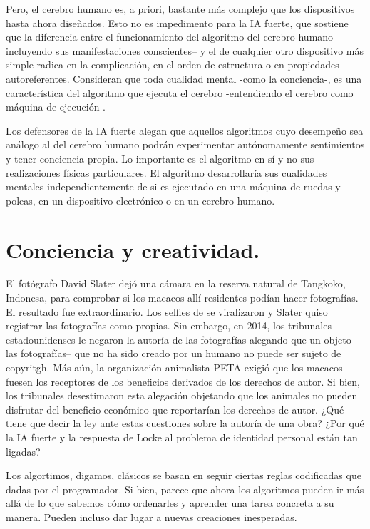\documentclass[main.tex]{subfiles}
\begin{document}
Pero, el cerebro humano es, a priori, bastante más complejo que los dispositivos hasta ahora diseñados. Esto no es impedimento para la IA fuerte, que sostiene que la diferencia entre el funcionamiento del algoritmo del cerebro humano –incluyendo sus manifestaciones conscientes– y el de cualquier otro dispositivo más simple radica en la complicación, en el orden de estructura o en propiedades autoreferentes. Consideran que toda cualidad mental -como la conciencia-, es una característica del algoritmo que ejecuta el cerebro -entendiendo el cerebro como máquina de ejecución-.

Los defensores de la IA fuerte alegan que aquellos algoritmos cuyo desempeño sea análogo al del cerebro humano podrán experimentar autónomamente sentimientos y tener conciencia propia. Lo importante es el algoritmo en sí y no sus realizaciones físicas particulares. El algoritmo desarrollaría sus cualidades mentales independientemente de si es ejecutado en una máquina de ruedas y poleas, en un dispositivo electrónico o en un cerebro humano.

\section{Conciencia y creatividad.}


El fotógrafo David Slater dejó una cámara en la reserva natural de Tangkoko, Indonesa, para comprobar si los macacos allí residentes podían hacer fotografías. El resultado fue extraordinario. Los selfies de  se viralizaron y Slater quiso registrar las fotografías como propias. Sin embargo, en 2014, los tribunales estadounidenses le negaron la autoría de las fotografías alegando que un objeto –las fotografías– que no ha sido creado por un humano no puede ser sujeto de copyritgh. Más aún, la organización animalista PETA exigió que los macacos fuesen los receptores de los beneficios derivados de los derechos de autor. Si bien, los tribunales desestimaron esta alegación objetando que los animales no pueden disfrutar del beneficio económico que reportarían los derechos de autor. ¿Qué tiene que decir la ley ante estas cuestiones sobre la autoría de una obra? ¿Por qué la IA fuerte y la respuesta de Locke al problema de identidad personal están tan ligadas?

Los algortimos, digamos, clásicos se basan en seguir ciertas reglas codificadas que dadas por el programador. Si bien, parece que ahora los algoritmos pueden ir más allá de lo que sabemos cómo ordenarles y aprender una tarea concreta a su manera. Pueden incluso dar lugar a nuevas creaciones inesperadas.
\end{document}
